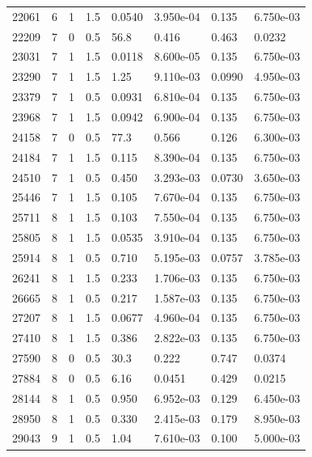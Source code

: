 \documentclass[preview]{standalone}
\begin{document}
{{{\begin{tabular}{L{1.2cm}C{1.2cm} C{0.3cm}C{0.5cm} C{1.4cm}C{1.4cm} C{1.4cm}C{1.4cm}}
  22061  &     6  & 1     & 1.5 &  0.0540  & 3.950e-04  & 0.135 &  6.750e-03   \\ 
  22209  &     7  & 0     & 0.5 &  56.8  & 0.416  & 0.463 &  0.0232   \\ 
  23031  &     7  & 1     & 1.5 &  0.0118  & 8.600e-05  & 0.135 &  6.750e-03   \\ 
  23290  &     7  & 1     & 1.5 &  1.25  & 9.110e-03  & 0.0990 &  4.950e-03   \\ 
  23379  &     7  & 1     & 0.5 &  0.0931  & 6.810e-04  & 0.135 &  6.750e-03   \\ 
  23968  &     7  & 1     & 1.5 &  0.0942  & 6.900e-04  & 0.135 &  6.750e-03   \\ 
  24158  &     7  & 0     & 0.5 &  77.3  & 0.566  & 0.126 &  6.300e-03   \\ 
  24184  &     7  & 1     & 1.5 &  0.115  & 8.390e-04  & 0.135 &  6.750e-03   \\ 
  24510  &     7  & 1     & 0.5 &  0.450  & 3.293e-03  & 0.0730 &  3.650e-03   \\ 
  25446  &     7  & 1     & 1.5 &  0.105  & 7.670e-04  & 0.135 &  6.750e-03   \\ 
  25711  &     8  & 1     & 1.5 &  0.103  & 7.550e-04  & 0.135 &  6.750e-03   \\ 
  25805  &     8  & 1     & 1.5 &  0.0535  & 3.910e-04  & 0.135 &  6.750e-03   \\ 
  25914  &     8  & 1     & 0.5 &  0.710  & 5.195e-03  & 0.0757 &  3.785e-03   \\ 
  26241  &     8  & 1     & 1.5 &  0.233  & 1.706e-03  & 0.135 &  6.750e-03   \\ 
  26665  &     8  & 1     & 0.5 &  0.217  & 1.587e-03  & 0.135 &  6.750e-03   \\ 
  27207  &     8  & 1     & 1.5 &  0.0677  & 4.960e-04  & 0.135 &  6.750e-03   \\ 
  27410  &     8  & 1     & 1.5 &  0.386  & 2.822e-03  & 0.135 &  6.750e-03   \\ 
  27590  &     8  & 0     & 0.5 &  30.3  & 0.222  & 0.747 &  0.0374   \\ 
  27884  &     8  & 0     & 0.5 &  6.16  & 0.0451  & 0.429 &  0.0215   \\ 
  28144  &     8  & 1     & 0.5 &  0.950  & 6.952e-03  & 0.129 &  6.450e-03   \\ 
  28950  &     8  & 1     & 0.5 &  0.330  & 2.415e-03  & 0.179 &  8.950e-03   \\ 
  29043  &     9  & 1     & 0.5 &  1.04  & 7.610e-03  & 0.100 &  5.000e-03   \\ 

\end{tabular}}}}
\end{document}
